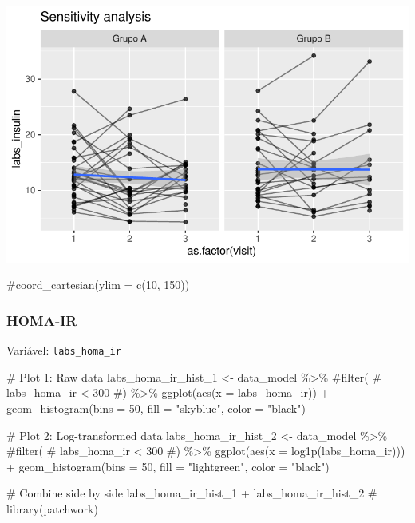 \documentclass[
  letterpaper,
  DIV=11,
  numbers=noendperiod]{scrartcl}
\newenvironment{Shaded}{\begin{snugshade}}{\end{snugshade}}
\newcommand{\AttributeTok}[1]{\textcolor[rgb]{0.40,0.45,0.13}{#1}}
\newcommand{\CommentTok}[1]{\textcolor[rgb]{0.37,0.37,0.37}{#1}}
\newcommand{\DecValTok}[1]{\textcolor[rgb]{0.68,0.00,0.00}{#1}}
\newcommand{\FunctionTok}[1]{\textcolor[rgb]{0.28,0.35,0.67}{#1}}
\newcommand{\NormalTok}[1]{\textcolor[rgb]{0.00,0.23,0.31}{#1}}
\newcommand{\OtherTok}[1]{\textcolor[rgb]{0.00,0.23,0.31}{#1}}
\newcommand{\SpecialCharTok}[1]{\textcolor[rgb]{0.37,0.37,0.37}{#1}}
\newcommand{\StringTok}[1]{\textcolor[rgb]{0.13,0.47,0.30}{#1}}
\begin{document}
\includegraphics{Outcomes_V1V2V3_files/figure-pdf/labs_insulin_6-2.pdf}

\begin{Shaded}
\begin{Highlighting}[]
    \CommentTok{\#coord\_cartesian(ylim = c(10, 150))}
\end{Highlighting}
\end{Shaded}

\subsubsection{HOMA-IR}\label{homa-ir}

Variável: \texttt{labs\_homa\_ir}

\begin{Shaded}
\begin{Highlighting}[]
\CommentTok{\# Plot 1: Raw data}
\NormalTok{labs\_homa\_ir\_hist\_1 }\OtherTok{\textless{}{-}}\NormalTok{ data\_model }\SpecialCharTok{\%\textgreater{}\%} 
    \CommentTok{\#filter(}
    \CommentTok{\#    labs\_homa\_ir \textless{} 300}
    \CommentTok{\#) \%\textgreater{}\% }
    \FunctionTok{ggplot}\NormalTok{(}\FunctionTok{aes}\NormalTok{(}\AttributeTok{x =}\NormalTok{ labs\_homa\_ir)) }\SpecialCharTok{+} 
    \FunctionTok{geom\_histogram}\NormalTok{(}\AttributeTok{bins =} \DecValTok{50}\NormalTok{, }\AttributeTok{fill =} \StringTok{"skyblue"}\NormalTok{, }\AttributeTok{color =} \StringTok{"black"}\NormalTok{)}

\CommentTok{\# Plot 2: Log{-}transformed data}
\NormalTok{labs\_homa\_ir\_hist\_2 }\OtherTok{\textless{}{-}}\NormalTok{ data\_model }\SpecialCharTok{\%\textgreater{}\%} 
    \CommentTok{\#filter(}
    \CommentTok{\#    labs\_homa\_ir \textless{} 300}
    \CommentTok{\#) \%\textgreater{}\%}
    \FunctionTok{ggplot}\NormalTok{(}\FunctionTok{aes}\NormalTok{(}\AttributeTok{x =} \FunctionTok{log1p}\NormalTok{(labs\_homa\_ir))) }\SpecialCharTok{+} 
    \FunctionTok{geom\_histogram}\NormalTok{(}\AttributeTok{bins =} \DecValTok{50}\NormalTok{, }\AttributeTok{fill =} \StringTok{"lightgreen"}\NormalTok{, }\AttributeTok{color =} \StringTok{"black"}\NormalTok{)}

\CommentTok{\# Combine side by side}
\NormalTok{labs\_homa\_ir\_hist\_1 }\SpecialCharTok{+}\NormalTok{ labs\_homa\_ir\_hist\_2 }\CommentTok{\# library(patchwork)}
\end{Highlighting}
\end{Shaded}
\end{document}
